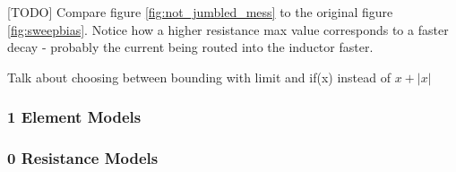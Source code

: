 [TODO] Compare figure \ref{fig:not_jumbled_mess} to the original figure \ref{fig:sweepbias}.
Notice how a higher resistance max value corresponds to a faster decay - probably the current
being routed into the inductor faster.

Talk about choosing between bounding with limit and if(x) instead of $x+|x|$

\subsubsection{1 Element Models}

\subsubsection{0 Resistance Models}